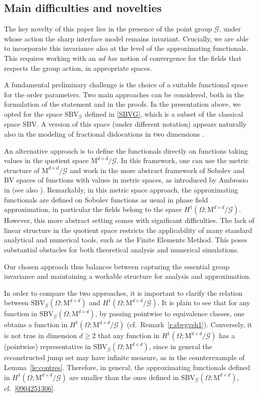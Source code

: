 \documentclass[a4paper,reqno]{amsart}
\newcommand{\BV}{\mathrm{BV}}
\newcommand{\SBV}{\mathrm{SBV}}
\newcommand{\SBVG}{\mathrm{SBV}_{\mathcal{G}}}
\theoremstyle{remark}
\newcommand{\G}{\mathcal{G}}
\newcommand{\Mno}{\mathrm{M}^{d\times d}}
\numberwithin{equation}{section}
\begin{document}
\subsection{Main difficulties and novelties}

The key novelty of this paper lies in the presence of the point group $\G$, under whose action the sharp interface model remains invariant. Crucially, we are able to incorporate this invariance  also at the level of the approximating functionals. This requires working with an \emph{ad hoc}
notion of convergence for the fields that respects the group action, in appropriate spaces.

 A fundamental preliminary challenge is the choice of
a suitable functional space for the order parameters.
Two main approaches can be considered, both in the formulation of the statement and in the proofs. In the presentation above, we opted for the space $\SBVG$ defined in \eqref{SBVG},
which is a subset of the classical space $\SBV$.
A version of this space (under different notation)
appears naturally also in the modeling of fractional dislocations
in two dimensions \cite{BadCic, GolMerMil}.

An alternative approach is to define the functionals directly on functions taking values in the quotient space $\Mno/\G$. In this framework, one can use the metric structure of $\Mno/\G$ and work in the more abstract framework of Sobolev and $\BV$ spaces of functions with values in  metric spaces, as introduced by Ambrosio in \cite{Amb90SBVX} (see also \cite{Resh}).  Remarkably, in this metric space approach, the approximating functionals are defined on Sobolev functions as usual in phase field approximation, in particular the fields belong to the space $H^1(\Omega; \Mno/\G)$. However,
this more abstract setting comes with significant difficulties.
The lack of linear structure in the quotient space restricts the applicability  of  many
standard analytical and numerical tools, such as the Finite Elements Method.
This poses substantial obstacles for both theoretical analysis and numerical simulations.

Our chosen approach thus balances between capturing the essential group invariance and maintaining a workable structure for analysis and approximation.

In order to compare the two approaches, it is important to clarify the relation between $\SBVG(\Omega; \Mno)$ and $H^1(\Omega; \Mno/\G)$. 
It is  plain to see that for any function in $\SBVG(\Omega; \Mno)$, by passing pointwise to equivalence classes, one obtains a function in $H^1(\Omega; \Mno/\G)$ (cf.\ Remark~\ref{r:sbvgvsh1}). Conversely, it is not true in dimension $d\geq 2$ that any function in $H^1(\Omega; \Mno/\G)$ has a (pointwise) representative in $\SBVG(\Omega; \Mno)$, since in general the reconstructed jump set may have infinite measure, as in the counterexample of Lemma~\ref{le:contres}. 
Therefore, in general, the approximating functionals defined in $H^1(\Omega; \Mno/\G)$ are smaller than the ones defined in 
$\SBVG(\Omega; \Mno)$, cf.\ \eqref{0904251306}.
\end{document}
